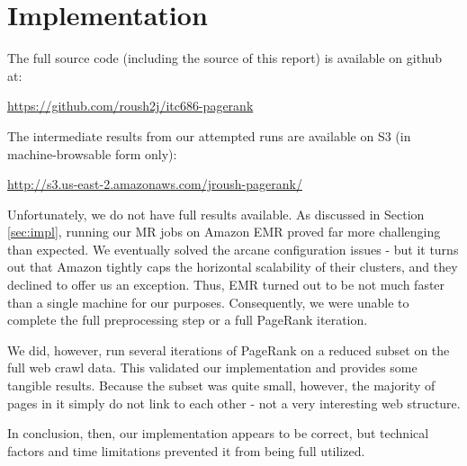 \section{Implementation} \label{sec:results}

The full source code (including the source of this report) is available on github
at:

\url{https://github.com/roush2j/itc686-pagerank}

The intermediate results from our attempted runs are available on S3 (in machine-browsable form only):

\url{http://s3.us-east-2.amazonaws.com/jroush-pagerank/}

Unfortunately, we do not have full results available.  As discussed in Section
\ref{sec:impl}, running our MR jobs on Amazon EMR proved far more challenging
than expected.  We eventually solved the arcane configuration issues - but it turns
out that Amazon tightly caps the horizontal scalability of their clusters, and
they declined to offer us an exception.  Thus, EMR turned out to be not much
faster than a single machine for our purposes.  Consequently, we were unable to
complete the full preprocessing step or a full PageRank iteration.

We did, however, run several iterations of PageRank on a reduced subset on the
full web crawl data.  This validated our implementation and provides some
tangible results.  Because the subset was quite small, however, the majority of 
pages in it simply do not link to each other - not a very interesting web
structure.

In conclusion, then, our implementation appears to be correct, but technical 
factors and time limitations prevented it from being full utilized.